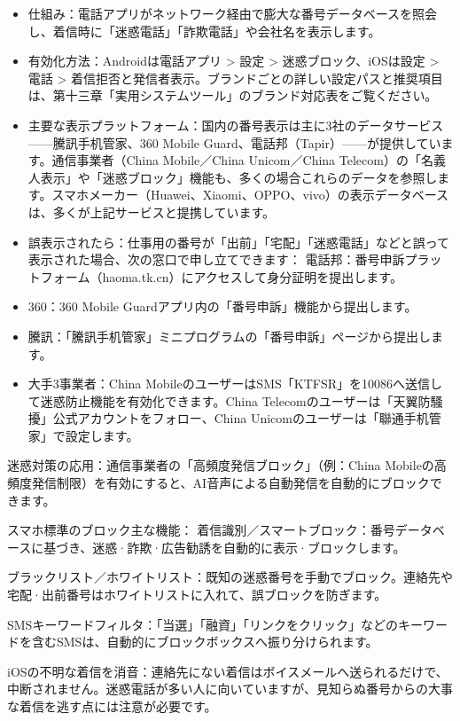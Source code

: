 
\begin{itemize}
  \item 仕組み：電話アプリがネットワーク経由で膨大な番号データベースを照会し、着信時に「迷惑電話」「詐欺電話」や会社名を表示します。
  \item 有効化方法：Androidは電話アプリ > 設定 > 迷惑ブロック、iOSは設定 > 電話 > 着信拒否と発信者表示。ブランドごとの詳しい設定パスと推奨項目は、第十三章「実用システムツール」のブランド対応表をご覧ください。
  \item 主要な表示プラットフォーム：国内の番号表示は主に3社のデータサービス——騰訊手机管家、360 Mobile Guard、電話邦（Tapir）——が提供しています。通信事業者（China Mobile／China Unicom／China Telecom）の「名義人表示」や「迷惑ブロック」機能も、多くの場合これらのデータを参照します。スマホメーカー（Huawei、Xiaomi、OPPO、vivo）の表示データベースは、多くが上記サービスと提携しています。
  \item 誤表示されたら：仕事用の番号が「出前」「宅配」「迷惑電話」などと誤って表示された場合、次の窓口で申し立てできます： 電話邦：番号申訴プラットフォーム（haoma.tk.cn）にアクセスして身分証明を提出します。
  \item 360：360 Mobile Guardアプリ内の「番号申訴」機能から提出します。
  \item 騰訊：「騰訊手机管家」ミニプログラムの「番号申訴」ページから提出します。
  \item 大手3事業者：China MobileのユーザーはSMS「KTFSR」を10086へ送信して迷惑防止機能を有効化できます。China Telecomのユーザーは「天翼防騷擾」公式アカウントをフォロー、China Unicomのユーザーは「聯通手机管家」で設定します。
\end{itemize}

迷惑対策の応用：通信事業者の「高頻度発信ブロック」（例：China Mobileの高頻度発信制限）を有効にすると、AI音声による自動発信を自動的にブロックできます。

スマホ標準のブロック主な機能： 着信識別／スマートブロック：番号データベースに基づき、迷惑·詐欺·広告勧誘を自動的に表示·ブロックします。

ブラックリスト／ホワイトリスト：既知の迷惑番号を手動でブロック。連絡先や宅配·出前番号はホワイトリストに入れて、誤ブロックを防ぎます。

SMSキーワードフィルタ：「当選」「融資」「リンクをクリック」などのキーワードを含むSMSは、自動的にブロックボックスへ振り分けられます。

iOSの不明な着信を消音：連絡先にない着信はボイスメールへ送られるだけで、中断されません。迷惑電話が多い人に向いていますが、見知らぬ番号からの大事な着信を逃す点には注意が必要です。

